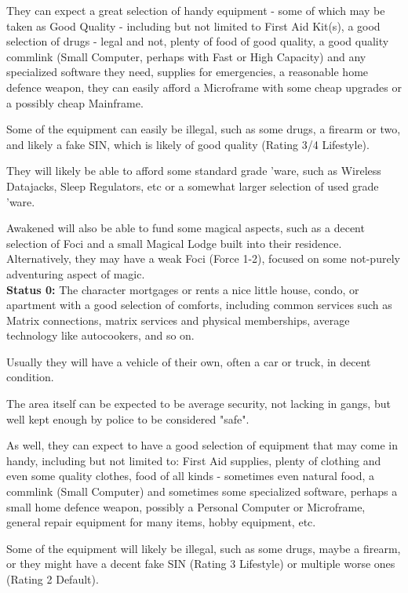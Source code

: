 \begin{multicols*}{2}
	They can expect a great selection of handy equipment - some of which may be taken as Good Quality - including but not limited to First Aid Kit(s), a good selection of drugs - legal and not, plenty of food of good quality, a good quality commlink (Small Computer, perhaps with Fast or High Capacity) and any specialized software they need, supplies for emergencies, a reasonable home defence weapon, they can easily afford a Microframe with some cheap upgrades or a possibly cheap Mainframe. 
	
	Some of the equipment can easily be illegal, such as some drugs, a firearm or two, and likely a fake SIN, which is likely of good quality (Rating 3/4 Lifestyle).
	
	They will likely be able to afford some standard grade 'ware, such as Wireless Datajacks, Sleep Regulators, etc or a somewhat larger selection of used grade 'ware.
	
	Awakened will also be able to fund some magical aspects, such as a decent selection of Foci and a small Magical Lodge built into their residence. Alternatively, they may have a weak Foci (Force 1-2), focused on some not-purely adventuring aspect of magic. \\
	
	\textbf{Status 0:} The character mortgages or rents a nice little house, condo, or apartment with a good selection of comforts, including common services such as Matrix connections, matrix services and physical memberships, average technology like autocookers, and so on. 
	
	Usually they will have a vehicle of their own, often a car or truck, in decent condition. 
	
	The area itself can be expected to be average security, not lacking in gangs, but well kept enough by police to be considered "safe". 
	
	As well, they can expect to have a good selection of equipment that may come in handy, including but not limited to: First Aid supplies, plenty of clothing and even some quality clothes, food of all kinds - sometimes even natural food, a commlink (Small Computer) and sometimes some specialized software, perhaps a small home defence weapon, possibly a Personal Computer or Microframe, general repair equipment for many items, hobby equipment, etc. 
	
	Some of the equipment will likely be illegal, such as some drugs, maybe a firearm, or they might have a decent fake SIN (Rating 3 Lifestyle) or multiple worse ones (Rating 2 Default).
	

\end{multicols*}
